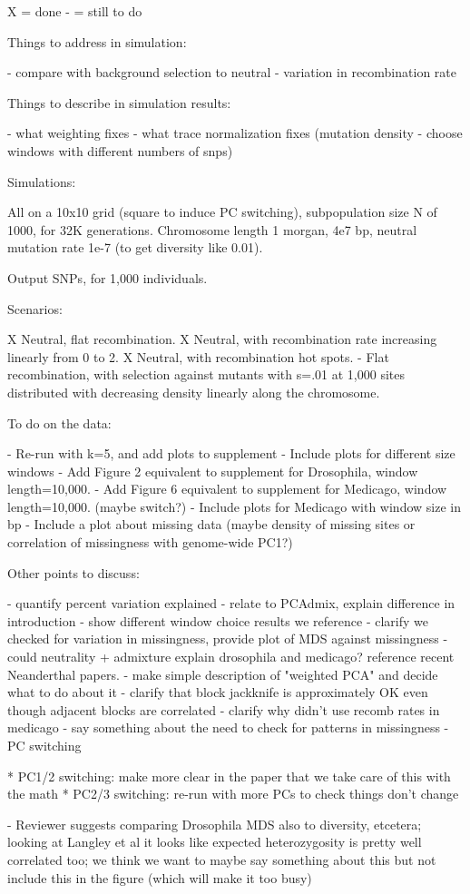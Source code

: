 X = done
- = still to do

Things to address in simulation:

- compare with background selection to neutral
- variation in recombination rate

Things to describe in simulation results:

- what weighting fixes
- what trace normalization fixes 
    (mutation density - choose windows with different numbers of snps)

Simulations:

All on a 10x10 grid (square to induce PC switching),
subpopulation size N of 1000, for 32K generations.
Chromosome length 1 morgan, 4e7 bp, neutral mutation rate 1e-7 (to get diversity like 0.01).

Output SNPs, for 1,000 individuals.

Scenarios:

X Neutral, flat recombination.
X Neutral, with recombination rate increasing linearly from 0 to 2.
X Neutral, with recombination hot spots.
- Flat recombination, with selection against mutants with s=.01 at 1,000 sites
    distributed with decreasing density linearly along the chromosome.


To do on the data:

- Re-run with k=5, and add plots to supplement
- Include plots for different size windows
- Add Figure 2 equivalent to supplement for Drosophila, window length=10,000.
- Add Figure 6 equivalent to supplement for Medicago, window length=10,000. (maybe switch?)
- Include plots for Medicago with window size in bp
- Include a plot about missing data 
    (maybe density of missing sites or correlation of missingness with genome-wide PC1?)


Other points to discuss:

- quantify percent variation explained
- relate to PCAdmix, explain difference in introduction
- show different window choice results we reference
- clarify we checked for variation in missingness, provide plot of MDS against missingness
- could neutrality + admixture explain drosophila and medicago? reference recent Neanderthal papers.
- make simple description of "weighted PCA" and decide what to do about it 
- clarify that block jackknife is approximately OK even though adjacent blocks are correlated
- clarify why didn't use recomb rates in medicago
- say something about the need to check for patterns in missingness
- PC switching

    * PC1/2 switching: make more clear in the paper that we take care of this with the math
    * PC2/3 switching: re-run with more PCs to check things don't change

- Reviewer suggests comparing Drosophila MDS also to diversity, etcetera;
    looking at Langley et al it looks like expected heterozygosity is pretty well correlated too;
    we think we want to maybe say something about this but not include this in the figure
    (which will make it too busy)


